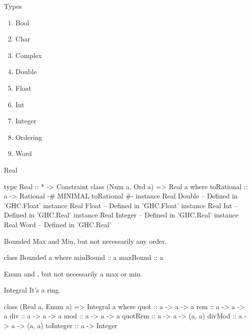 \documentclass[openany, 11pt]{book}
\begin{document}
\begin{definition}{Types}{}
	\begin{multicols}{2}
		\begin{enumerate}[label = {(\arabic*)}]
			\item Bool
			\item Char
			\item Complex
			\item Double
			\item Float
			\item Int
			\item Integer
			\item Ordering
			\item Word
		\end{enumerate}
	\end{multicols}
\end{definition}



\begin{intuition}{Real}{}
	\begin{haskell}{}
type Real :: * -> Constraint
class (Num a, Ord a) => Real a where
    toRational :: a -> Rational
{-# MINIMAL toRational #-}
instance Real Double -- Defined in 'GHC.Float’
instance Real Float -- Defined in 'GHC.Float’
instance Real Int -- Defined in 'GHC.Real’
instance Real Integer -- Defined in 'GHC.Real’
instance Real Word -- Defined in 'GHC.Real’
    \end{haskell}

\end{intuition}

\begin{intuition}{Bounded}{}
	Max and Min, but not necessarily any order.
	\begin{haskell}{}
class Bounded a where
    minBound :: a
    maxBound :: a
    \end{haskell}
\end{intuition}

\begin{intuition}{Enum}{}
	 and , but not necessarily a max or min.
\end{intuition}

\begin{intuition}{Integral}{}
	It's a ring.
	\begin{haskell}{}
class (Real a, Enum a) => Integral a where
    quot :: a -> a -> a
    rem :: a -> a -> a
    div :: a -> a -> a
    mod :: a -> a -> a
    quotRem :: a -> a -> (a, a)
    divMod :: a -> a -> (a, a)
    toInteger :: a -> Integer
    \end{haskell}
\end{intuition}
\end{document}
